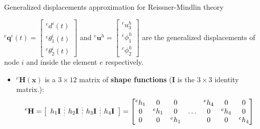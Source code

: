 \documentclass[aspectratio=169]{beamer}
\begin{document}
{\begin{frame}{Generalized displacements approximation for Reissner-Mindlin theory}
\begin{block}{}
      ${}^e\mathbf q^i(t)=\begin{bmatrix}
          {}^e d^{i}(t) \\ {}^e \theta^{i}_1(t) \\ {}^e \theta^{i}_2(t)
        \end{bmatrix}$ and ${}^e\mathbf u^h=\begin{bmatrix}
          {}^e u_3^h \\ {}^e \phi_1^h \\ {}^e \phi_2^h
        \end{bmatrix}$ are the generalized displacements of node $i$ and inside the element $e$ respectively.
    \end{block}
    \begin{itemize}
      \item ${}^e\mathbf H(\mathbf x)$ is a $3\times 12$ matrix of \textbf{shape functions} ($\mathbf I$ is the $3\times 3$ identity matrix.):
            $$
              {}^e\mathbf H
              =\left[
                \begin{array}{c;{2pt/2pt}c;{2pt/2pt}c;{2pt/2pt}c}
                  h_{1}\mathbf I & h_{2}\mathbf I & h_{3}\mathbf I & h_{4}\mathbf I \\
                \end{array} \right] = \begin{bmatrix}
                {}^eh_1 & 0       & 0       &       & {}^eh_{4} & 0         & 0         \\
                0       & {}^eh_1 & 0       & \dots & 0         & {}^eh_{4} & 0         \\
                0       & 0       & {}^eh_1 &       & 0         & 0         & {}^eh_{4} \\
              \end{bmatrix}
            $$
    \end{itemize}
  \end{frame}

}
\end{document}
